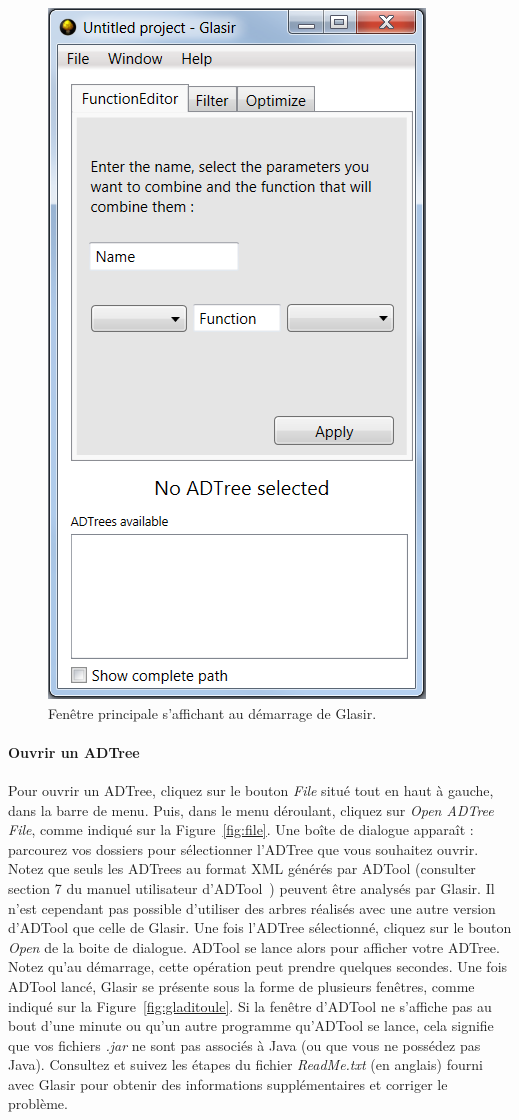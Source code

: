 	\begin{figure}[H]
        \centering
        \includegraphics[height=0.7\textwidth]{figure/glasirFenetrePrincipale.png}
        \caption{Fenêtre principale s'affichant au démarrage de Glasir.}
        \label{fig:princ}
    \end{figure}

\paragraph{Ouvrir un ADTree}
Pour ouvrir un ADTree, cliquez sur le bouton \emph{File} situé tout en haut à gauche, dans la barre de menu. Puis, dans le menu déroulant, cliquez sur \emph{Open ADTree File}, comme indiqué sur la {\sc Figure}~\ref{fig:file}. Une boîte de dialogue apparaît : parcourez vos dossiers pour sélectionner l'ADTree que vous souhaitez ouvrir. Notez que seuls les ADTrees au format XML générés par ADTool (consulter {\sc section} 7 du manuel utilisateur d'ADTool~\cite{ADTool_Manual}) peuvent être analysés par Glasir. Il n'est cependant pas possible d'utiliser des arbres réalisés avec une autre version d'ADTool que celle de Glasir. Une fois l'ADTree sélectionné, cliquez sur le bouton \emph{Open} de la boite de dialogue. ADTool se lance alors pour afficher votre ADTree. Notez qu'au démarrage, cette opération peut prendre quelques secondes. Une fois ADTool lancé, Glasir se présente sous la forme de plusieurs fenêtres, comme indiqué sur la {\sc Figure}~\ref{fig:gladitoule}. Si la fenêtre d'ADTool ne s'affiche pas au bout d'une minute ou qu'un autre programme qu'ADTool se lance, cela signifie que vos fichiers \emph{.jar} ne sont pas associés à Java (ou que vous ne possédez pas Java). Consultez et suivez les étapes du fichier \emph{ReadMe.txt} (en anglais) fourni avec Glasir pour obtenir des informations supplémentaires et corriger le problème.

